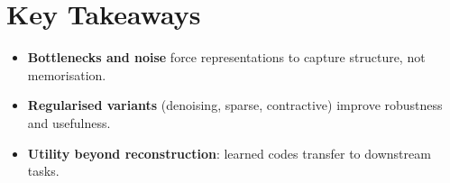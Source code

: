 
\section*{Key Takeaways}

\begin{keytakeaways}
\begin{itemize}[leftmargin=2em]
    \item \textbf{Bottlenecks and noise} force representations to capture structure, not memorisation.
    \item \textbf{Regularised variants} (denoising, sparse, contractive) improve robustness and usefulness.
    \item \textbf{Utility beyond reconstruction}: learned codes transfer to downstream tasks.
\end{itemize}
\end{keytakeaways}


